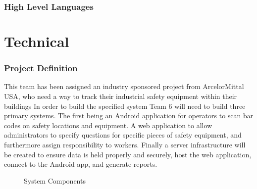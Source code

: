 \documentclass[Letter,11pt]{article}
\begin{document}
\section{High Level Languages}\label{highlevel}


\part{Technical}
\section{Project Definition}\label{def}
	This team has been assigned an industry sponsored project from ArcelorMittal USA, who need a way to track their industrial safety equipment within their buildings In order to build the specified system Team 6 will need to build three primary systems. The first being an Android application for operators to scan bar codes on safety locations and equipment. A web application to allow administrators to specify questions for specific pieces of safety equipment, and furthermore assign responsibility to workers. Finally a server infrastructure will be created to ensure data is held properly and securely, host the web application, connect to the Android app, and generate reports. 
			
	\begin{figure}[h]
		\centering
		
		\caption{\label{sysConn} System Components}
	\end{figure}
	
\end{document}
